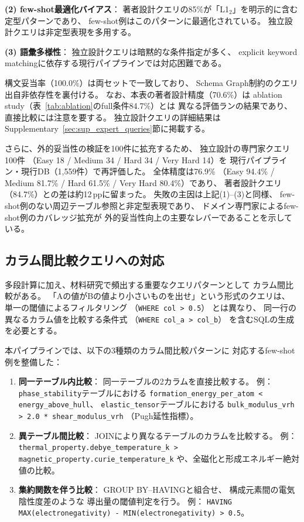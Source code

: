\documentclass[5p,twocolumn]{elsarticle}
\begin{document}
\textbf{(2) few-shot最適化バイアス}：
著者設計クエリの85\%が「L1$_2$」を明示的に含む定型パターンであり、
few-shot例はこのパターンに最適化されている。
独立設計クエリは非定型表現を多用する。

\textbf{(3) 語彙多様性}：
独立設計クエリは暗黙的な条件指定が多く、
explicit keyword matchingに依存する現行パイプラインでは対応困難である。

構文妥当率（100.0\%）は両セットで一致しており、
Schema Graph制約のクエリ出自非依存性を裏付ける。
なお、本表の著者設計精度（70.6\%）は
ablation study（表~\ref{tab:ablation}のfull条件84.7\%）とは
異なる評価ランの結果であり、直接比較には注意を要する。
独立設計クエリの詳細結果は
Supplementary~\ref{sec:sup_expert_queries}節に掲載する。

さらに、外的妥当性の検証を100件に拡充するため、
独立設計の専門家クエリ100件
（Easy 18 / Medium 34 / Hard 34 / Very Hard 14）を
現行パイプライン・現行DB（1{,}559件）で再評価した。
全体精度は76.9\%
（Easy 94.4\% / Medium 81.7\% / Hard 61.5\% / Very Hard 80.4\%）であり、
著者設計クエリ（84.7\%）との差は約12\,ppに留まった。
失敗の主因は上記(1)--(3)と同様、
few-shot例のない周辺テーブル参照と非定型表現であり、
ドメイン専門家によるfew-shot例のカバレッジ拡充が
外的妥当性向上の主要なレバーであることを示している。

\subsection{カラム間比較クエリへの対応}
\label{sec:column_comparison}

多段計算に加え、材料研究で頻出する重要なクエリパターンとして
カラム間比較がある。
「Aの値がBの値より小さいものを出せ」という形式のクエリは、
単一の閾値によるフィルタリング
（\texttt{WHERE col > 0.5}）
とは異なり、
同一行の異なるカラム値を比較する条件式
（\texttt{WHERE col\_a > col\_b}）
を含むSQLの生成を必要とする。

本パイプラインでは、以下の3種類のカラム間比較パターンに
対応するfew-shot例を整備した：
\begin{enumerate}
  \item \textbf{同一テーブル内比較}：
    同一テーブルの2カラムを直接比較する。
    例：\texttt{phase\_stability}テーブルにおける
    \texttt{formation\_energy\_per\_atom < energy\_above\_hull}、
    \texttt{elastic\_tensor}テーブルにおける
    \texttt{bulk\_modulus\_vrh > 2.0 * shear\_modulus\_vrh}
    （Pugh延性指標）。
  \item \textbf{異テーブル間比較}：
    JOINにより異なるテーブルのカラムを比較する。
    例：\texttt{thermal\_property.debye\_temperature\_k >
    magnetic\_property.curie\_temperature\_k}
    や、全磁化と形成エネルギー絶対値の比較。
  \item \textbf{集約関数を伴う比較}：
    GROUP BY--HAVINGと組合せ、
    構成元素間の電気陰性度差のような
    導出量の閾値判定を行う。
    例：
    \texttt{HAVING MAX(electronegativity) - MIN(electronegativity) > 0.5}。
\end{enumerate}
\end{document}
